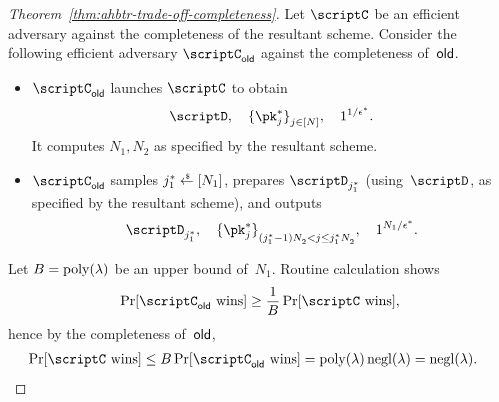 \begin{proof}
[%
Theorem~\ref{thm:ahbtr-trade-off-completeness}]
Let $\scriptC$ be an efficient adversary against the completeness of the resultant scheme.
Consider the following efficient adversary $\scriptC_\OLD$ against the complete\-ness of~$\OLD$.
\begin{itemize}
\item $\scriptC_\OLD$ launches $\scriptC$ to obtain
\begin{align*}
\scriptD,\quad
\{\pk^\ast_j\}_{j\in[N]}^\sphantom,\quad
1^{1/\epsilon^\ast}.
\end{align*}
It computes $N_1,N_2$ as specified by the resultant scheme.
\item $\scriptC_\OLD$ samples ${j^\ast_1\draws[N_1]}$,
prepares $\scriptD_{j^\ast_1}$ (using~$\scriptD$, as specified by the resultant scheme), and outputs
\begin{align*}
\scriptD_{j^\ast_1},\quad
\{\pk^\ast_j\}_{(j^\ast_1-1)N_2^\sphantom<j\leq j^\ast_1N_2^\sphantom}^\sphantom,\quad
1^{N_1/\epsilon^\ast}.
\end{align*}
\end{itemize}
Let ${B=\operatorname{poly}(\lambda)}$ be an upper bound of~$N_1$.
Routine calculation shows
\begin{align*}
\Pr[\scriptC_\OLD\textup{ wins}]
\geq
\frac{1}{B}\Pr[\scriptC\textup{ wins}],
\end{align*}
hence by the completeness of~$\OLD$,
\begin{align*}
\Pr[\scriptC\textup{ wins}]
&{}\leq
B\Pr[\scriptC_\OLD\textup{ wins}]
=
\poly(\lambda)\negl(\lambda)
=
\negl(\lambda).
\qedhere
\end{align*}
\end{proof}
